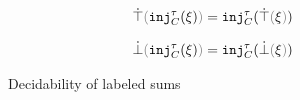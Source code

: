 
\begin{figure}[ht]

  \begin{align*}
    \ctruify{\cinj{C}{\tau}{\xi}} & = \cinj{C}{\tau}{\ctruify{\xi}}
  \end{align*}


  \begin{align*}
    \cfalsify{\cinj{C}{\tau}{\xi}} & = \cinj{C}{\tau}{\cfalsify{\xi}}
  \end{align*}

  \judgbox{\cincon{\Xi}}{}

  \begin{mathpar}

  \end{mathpar}

  \caption{Decidability of labeled sums}
  \label{fig:labeled-sums-decidability}
\end{figure}

